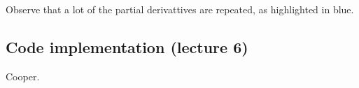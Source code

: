 \documentclass[11pt]{article}
\numberwithin{equation}{section}
\theoremstyle{definition}%
\begin{document}
Observe that a lot of the partial derivattives are repeated, as highlighted in blue. 







\subsection{Code implementation (lecture 6)}



\begin{thebibliography}{2}
     Cooper.

\end{thebibliography}
\end{document}
